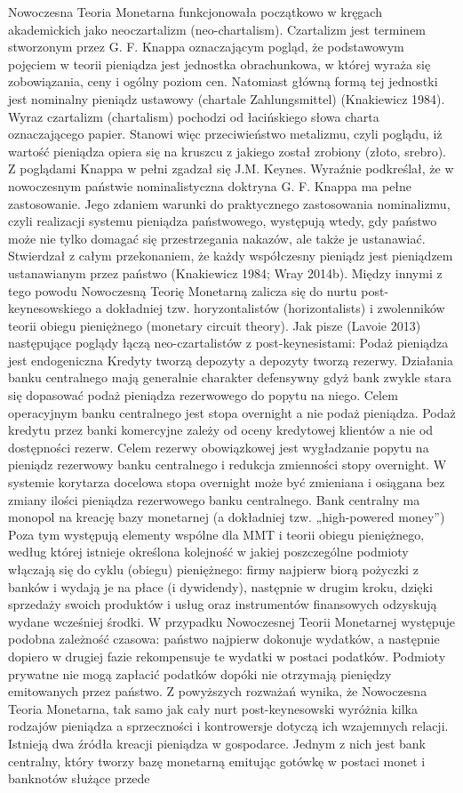 \documentclass[
]{book}
\begin{document}
Nowoczesna Teoria Monetarna funkcjonowała początkowo w kręgach akademickich jako neoczartalizm (neo-chartalism). Czartalizm jest terminem stworzonym przez G. F. Knappa oznaczającym pogląd, że podstawowym pojęciem w teorii pieniądza jest jednostka obrachunkowa, w której wyraża się zobowiązania, ceny i ogólny poziom cen. Natomiast główną formą tej jednostki jest nominalny pieniądz ustawowy (chartale Zahlungsmittel) (Knakiewicz 1984). Wyraz czartalizm (chartalism) pochodzi od łacińskiego słowa charta oznaczającego papier. Stanowi więc przeciwieństwo metalizmu, czyli poglądu, iż wartość pieniądza opiera się na kruszcu z jakiego został zrobiony (złoto, srebro). Z poglądami Knappa w pełni zgadzał się J.M. Keynes. Wyraźnie podkreślał, że w nowoczesnym państwie nominalistyczna doktryna G. F. Knappa ma pełne zastosowanie. Jego zdaniem warunki do praktycznego zastosowania nominalizmu, czyli realizacji systemu pieniądza państwowego, występują wtedy, gdy państwo może nie tylko domagać się przestrzegania nakazów, ale także je ustanawiać. Stwierdzał z całym przekonaniem, że każdy współczesny pieniądz jest pieniądzem ustanawianym przez państwo (Knakiewicz 1984; Wray 2014b). Między innymi z tego powodu Nowoczesną Teorię Monetarną zalicza się do nurtu post-keynesowskiego a dokładniej tzw. horyzontalistów (horizontalists) i zwolenników teorii obiegu pieniężnego (monetary circuit theory). Jak pisze (Lavoie 2013) następujące poglądy łączą neo-czartalistów z post-keynesistami: Podaż pieniądza jest endogeniczna Kredyty tworzą depozyty a depozyty tworzą rezerwy. Działania banku centralnego mają generalnie charakter defensywny gdyż bank zwykle stara się dopasować podaż pieniądza rezerwowego do popytu na niego. Celem operacyjnym banku centralnego jest stopa overnight a nie podaż pieniądza. Podaż kredytu przez banki komercyjne zależy od oceny kredytowej klientów a nie od dostępności rezerw. Celem rezerwy obowiązkowej jest wygładzanie popytu na pieniądz rezerwowy banku centralnego i redukcja zmienności stopy overnight. W systemie korytarza docelowa stopa overnight może być zmieniana i osiągana bez zmiany ilości pieniądza rezerwowego banku centralnego. Bank centralny ma monopol na kreację bazy monetarnej (a dokładniej tzw. „high-powered money'') Poza tym występują elementy wspólne dla MMT i teorii obiegu pieniężnego, według której istnieje określona kolejność w jakiej poszczególne podmioty włączają się do cyklu (obiegu) pieniężnego: firmy najpierw biorą pożyczki z banków i wydają je na płace (i dywidendy), następnie w drugim kroku, dzięki sprzedaży swoich produktów i usług oraz instrumentów finansowych odzyskują wydane wcześniej środki. W przypadku Nowoczesnej Teorii Monetarnej występuje podobna zależność czasowa: państwo najpierw dokonuje wydatków, a następnie dopiero w drugiej fazie rekompensuje te wydatki w postaci podatków. Podmioty prywatne nie mogą zapłacić podatków dopóki nie otrzymają pieniędzy emitowanych przez państwo. Z powyższych rozważań wynika, że Nowoczesna Teoria Monetarna, tak samo jak cały nurt post-keynesowski wyróżnia kilka rodzajów pieniądza a sprzeczności i kontrowersje dotyczą ich wzajemnych relacji. Istnieją dwa źródła kreacji pieniądza w gospodarce. Jednym z nich jest bank centralny, który tworzy bazę monetarną emitując gotówkę w postaci monet i banknotów służące przede 
\end{document}
